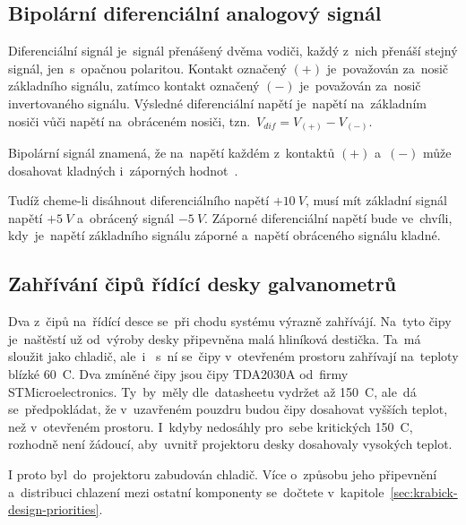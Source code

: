 \subsection{Bipolární diferenciální analogový signál}
Diferenciální signál je~signál přenášený dvěma vodiči, každý z~nich přenáší stejný signál, jen~s~opačnou polaritou. Kontakt označený $(+)$ je~považován za~nosič základního signálu, zatímco kontakt označený $(-)$ je~považován za~nosič invertovaného signálu. Výsledné diferenciální napětí je~napětí na~základním nosiči vůči napětí na~obráceném nosiči, tzn.~$V_{dif} = V_{(+)} - V_{(-)}$.~\cite{ilda-signal-spec}

Bipolární signál znamená, že na~napětí každém z~kontaktů $(+)$ a~$(-)$ může dosahovat kladných i~záporných hodnot~\cite{ilda-signal-spec}.

Tudíž cheme-li disáhnout diferenciálního napětí $+10~V$, musí mít základní signál napětí $+5~V$ a~obrácený signál $-5~V$. Záporné diferenciální napětí bude ve~chvíli, kdy~je~napětí základního signálu záporné a~napětí obráceného signálu kladné.

\subsection{Zahřívání čipů řídící desky galvanometrů} \label{sec:galvoboard-chips-heating-up}
Dva z~čipů na~řídící desce se~při chodu systému výrazně zahřívájí. Na~tyto čipy je~naštěstí už od~výroby desky připevněna malá hliníková destička. Ta~má sloužit jako chladič, ale~i ~s~ní se~čipy v~otevřeném prostoru zahřívají na~teploty blízké 60~\degree{}C.
Dva zmíněné čipy jsou čipy TDA2030A od~firmy STMicroelectronics. Ty~by~měly dle~datasheetu vydržet až 150~\degree{}C, ale~dá se~předpokládat, že v~uzavřeném pouzdru budou čipy dosahovat vyšších teplot, než v~otevřeném prostoru. I~kdyby nedosáhly pro~sebe kritických 150~\degree{}C, rozhodně není žádoucí, aby~uvnitř projektoru desky dosahovaly vysokých teplot.

I proto byl~do~projektoru zabudován chladič. Více o~způsobu jeho připevnění a~distribuci chlazení mezi ostatní komponenty se~dočtete v~kapitole~\ref{sec:krabick-design-priorities}.
